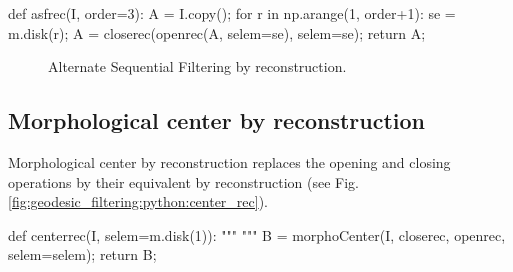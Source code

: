 \begin{python}
def asfrec(I, order=3):
    A = I.copy();
    for r in np.arange(1, order+1):
        se = m.disk(r);
        A = closerec(openrec(A, selem=se), selem=se);
    return A;
\end{python}

\begin{figure}[htbp]
 \centering\caption{Alternate Sequential Filtering by reconstruction.}%
 \hfill
 \hfill
 \label{fig:geodesic_filtering:python:asf_rec}%
\end{figure}

\subsection{Morphological center by reconstruction}
Morphological center by reconstruction replaces the opening and closing operations by their equivalent by reconstruction (see Fig.\ref{fig:geodesic_filtering:python:center_rec}).

\begin{python}
def centerrec(I, selem=m.disk(1)):
    """
    """
    B = morphoCenter(I, closerec, openrec, selem=selem);
    return B;
\end{python}

